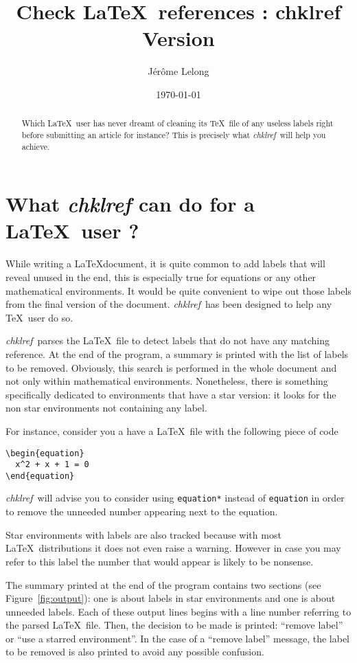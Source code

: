 \documentclass[a4paper,11pt,twoside]{article}
\title{Check \LaTeX\ references : chklref \\
Version \chkVERSION}
\date{\today}
\author{J\'er\^ome Lelong}
\def\chk{{\it chklref}}
\begin{document}
\maketitle

\begin{abstract} Which \LaTeX\ user has never dreamt of cleaning its \TeX\ file
  of any useless labels right before submitting an article for instance? This is
  precisely what \chk\ will help you achieve.
\end{abstract}

\section{What {\it chklref} can do for a \LaTeX\ user ?}

While writing a \LaTeX document, it is quite common to add labels that will 
reveal unused in the end, this is especially true for equations or any other
mathematical environments. It would be quite convenient to wipe out those labels
from the final version of the document. \chk\ has been designed to help any
\TeX\ user do so.

\chk\ parses the \LaTeX\ file to detect labels that do not have any matching
reference. At the end of the program, a summary is printed with the list of
labels to be removed. Obviously, this search is performed in the whole document
and not only within mathematical environments. Nonetheless, there is something
specifically dedicated to environments that have a star version: it looks
for the non star environments not containing any label.

For instance, consider you a have a \LaTeX\ file with the following piece of code
\begin{verbatim}
\begin{equation}
  x^2 + x + 1 = 0
\end{equation}
\end{verbatim}
\chk\ will advise you to consider using \verb!equation*! instead of
\verb!equation! in order to remove the unneeded number appearing next to the
equation.

Star environments with labels are also tracked because with most \LaTeX\
distributions it does not even raise a warning. However in case you may refer to
this label the number that would appear is likely to be nonsense.

The summary printed at the end of the program contains two sections (see
Figure~\ref{fig:output}): one is about labels in star environments and one is about
unneeded labels. Each of these output lines begins with a line number referring
to the parsed \LaTeX\ file. Then, the decision to be made is printed:
``remove label'' or ``use a starred environment''. In the case of a ``remove
label'' message, the label to be removed is also printed to avoid any possible
confusion.
\end{document}
